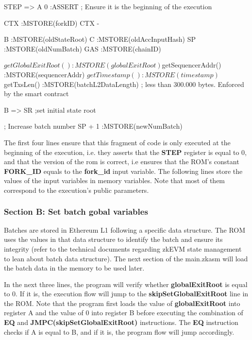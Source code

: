 \begin{zkasm}
    STEP => A
    0                                   :ASSERT ; Ensure it is the beginning of the execution
    
    CTX                                 :MSTORE(forkID)
    CTX - %
    
    B                                   :MSTORE(oldStateRoot)
    C                                   :MSTORE(oldAccInputHash)
    SP                                  :MSTORE(oldNumBatch)
    GAS                                 :MSTORE(chainID)
    
    ${getGlobalExitRoot()}              :MSTORE(globalExitRoot)
    ${getSequencerAddr()}               :MSTORE(sequencerAddr)
    ${getTimestamp()}                   :MSTORE(timestamp)
    ${getTxsLen()}                      :MSTORE(batchL2DataLength) ; less than 300.000 bytes. Enforced by the smart contract
    
    B => SR ;set initial state root
    
    ; Increase batch number
    SP + 1                              :MSTORE(newNumBatch)
\end{zkasm}

The first four lines ensure that this fragment of code is only executed at the beginning of the execution, 
i.e. they asserts that the \textbf{STEP} register is equal to 0, and that the version of the rom is correct, 
i.e ensures that the ROM's constant \textbf{FORK\_ID} equals to the \textbf{fork\_id} input variable. 
The following lines store the values of the input variables in memory variables. 
Note that most of them correspond to the execution's public parameters.

\subsubsection{Section B: Set batch gobal variables}

Batches are stored in Ethereum L1 following a specific data structure. 
The ROM uses the values in that data structure to identify the batch and ensure its integrity 
(refer to the technical documents regarding zkEVM state management to lean about batch data structure). 
The next section of the main.zkasm will load the batch data in the memory to be used later.

In the next three lines, the program will verify whether \textbf{globalExitRoot} is equal to 0. If it is, the execution flow will jump to the \textbf{skipSetGlobalExitRoot} line in the ROM. Note that the program first loads the value of \textbf{globalExitRoot} into register A and the value of 0 into register B before executing the combination of \textbf{EQ} and \textbf{JMPC(skipSetGlobalExitRoot)} instructions. The \textbf{EQ} instruction checks if A is equal to B, and if it is, the program flow will jump accordingly.


